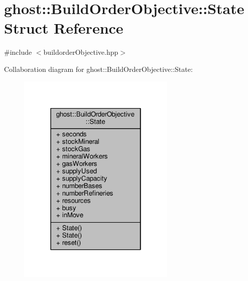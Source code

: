 \hypertarget{structghost_1_1BuildOrderObjective_1_1State}{\section{ghost\-:\-:Build\-Order\-Objective\-:\-:State Struct Reference}
\label{structghost_1_1BuildOrderObjective_1_1State}
}


{\ttfamily \#include $<$buildorder\-Objective.\-hpp$>$}



Collaboration diagram for ghost\-:\-:Build\-Order\-Objective\-:\-:State\-:
\nopagebreak
\begin{figure}[H]
\begin{center}
\leavevmode
\includegraphics[width=214pt]{structghost_1_1BuildOrderObjective_1_1State__coll__graph}
\end{center}
\end{figure}
